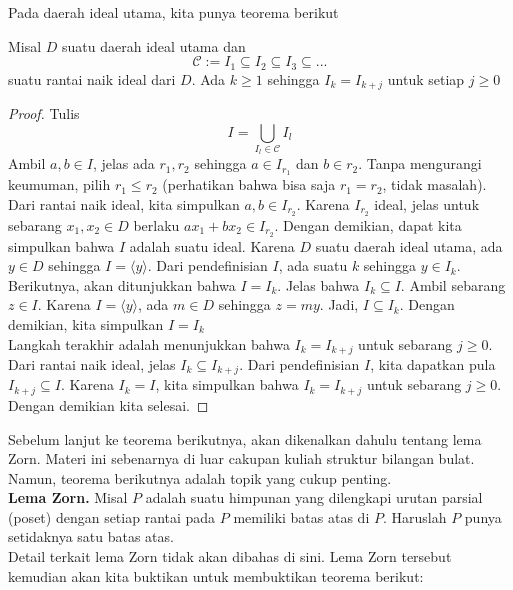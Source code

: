 	Pada daerah ideal utama, kita punya teorema berikut
	\begin{theorem}
	Misal $D$ suatu daerah ideal utama dan $$\mathcal{C} := I_1 \subseteq I_2 \subseteq I_3 \subseteq ...$$ suatu rantai naik ideal dari $D$. Ada $k \ge 1$ sehingga $I_k = I_{k+j}$ untuk setiap $j \ge 0$
	\end{theorem}
	\begin{proof}
		Tulis $$I = \bigcup_{I_l \in \mathcal{C}} I_l$$
		Ambil $a,b \in I$, jelas ada $r_1, r_2$ sehingga $a \in I_{r_1}$ dan $b \in r_2$. Tanpa mengurangi keumuman, pilih $r_1 \le r_2$ (perhatikan bahwa bisa saja $r_1 = r_2$, tidak masalah). Dari rantai naik ideal, kita simpulkan $a,b \in I_{r_2}$. Karena $I_{r_2}$ ideal, jelas untuk sebarang $x_1, x_2 \in D$ berlaku $ax_1 + bx_2 \in I_{r_2}$. Dengan demikian, dapat kita simpulkan bahwa $I$ adalah suatu ideal. Karena $D$ suatu daerah ideal utama, ada $y \in D$ sehingga $I = \langle y \rangle$. Dari pendefinisian $I$, ada suatu $k$ sehingga $y \in I_k$.
		\\
		
		Berikutnya, akan ditunjukkan bahwa $I = I_k$. Jelas bahwa $I_k \subseteq I$. Ambil sebarang $z \in I$. Karena $I = \langle y \rangle$, ada $m \in D$ sehingga $z = my$. Jadi, $I \subseteq I_k$. Dengan demikian, kita simpulkan $I = I_k$
		\\
		
		Langkah terakhir adalah menunjukkan bahwa $I_k = I_{k+j}$ untuk sebarang $j \ge 0$. Dari rantai naik ideal, jelas $I_k \subseteq I_{k+j}$. Dari pendefinisian $I$, kita dapatkan pula $I_{k+j} \subseteq I$. Karena $I_k = I$, kita simpulkan bahwa $I_k = I_{k+j}$ untuk sebarang $j \ge 0$. Dengan demikian kita selesai.
	\end{proof}
	Sebelum lanjut ke teorema berikutnya, akan dikenalkan dahulu tentang lema Zorn. Materi ini sebenarnya di luar cakupan kuliah struktur bilangan bulat. Namun, teorema berikutnya adalah topik yang cukup penting.\\
	
	\textbf{Lema Zorn.} Misal $P$ adalah suatu himpunan yang dilengkapi urutan parsial (poset) dengan setiap rantai pada $P$ memiliki batas atas di $P$. Haruslah $P$ punya setidaknya satu batas atas.\\
	
	Detail terkait lema Zorn tidak akan dibahas di sini. Lema Zorn tersebut kemudian akan kita buktikan untuk membuktikan teorema berikut:
	
